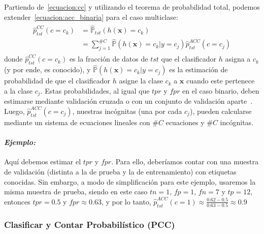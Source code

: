 Partiendo de~\ref{ecuacion:cc} y utilizando el teorema de probabilidad total,
podemos extender~\ref{ecuacion:acc_binaria} para el caso multiclase:
\begin{align}
\begin{split}
    \hat p^{CC}_{tst}(c=c_k) &= \mathbb{\hat P}_{tst}(h(\boldsymbol{x})=c_k) \\
    &= \sum \limits_{j=1}^{\#C}{\mathbb{\hat P}(h(\boldsymbol{x})=c_k|y=c_j) \hat p^{ACC}_{tst}(c=c_j)}\label{ecuacion:acc_multiclase}
\end{split}
\end{align}
donde $\hat p^{CC}_{tst}(c=c_k)$ es la fracción de datos de $tst$ que el
clasificador $h$ asigna a $c_k$ (y por ende, es conocido), y
$\mathbb{\hat{P}}(h(\boldsymbol{x})=c_k|y=c_j)$ es la estimación de probabilidad
de que el clasificador $h$ asigne la clase $c_k$ a $\boldsymbol{x}$ cuando este
pertenece a la clase $c_j$. Estas probabilidades, al igual que $tpr$ y $fpr$ en
el caso binario, deben estimarse mediante validación cruzada o con un conjunto
de validación aparte~\cite{barranquero2013study, forman2005counting,
forman2008quantifying}. Luego, $\hat p^{ACC}_{tst}(c=c_j)$, nuestras incógnitas
(una por cada $c_j$), pueden calcularse mediante un sistema de ecuaciones
lineales con $\#C$ ecuaciones y $\#C$ incógnitas.

\paragraph{\it Ejemplo:\/} Aquí debemos estimar el $tpr$ y $fpr$. Para ello,
deberíamos contar con una muestra de validación (distinta a la de prueba y la de
entrenamiento) con etiquetas conocidas. Sin embargo, a modo de simplificación
para este ejemplo, usaremos la misma muestra de prueba, siendo en este caso
$tn=1$, $fp=1$, $fn=7$ y $tp=12$, entonces $tpr=0.5$ y $fpr \approx 0.63$, y por
lo tanto, $\hat p^{ACC}_{tst}(c=1) \approx \frac{0.62-0.5}{0.63-0.5} \approx
0.9$

\subsubsection{Clasificar y Contar Probabilístico (PCC)}

